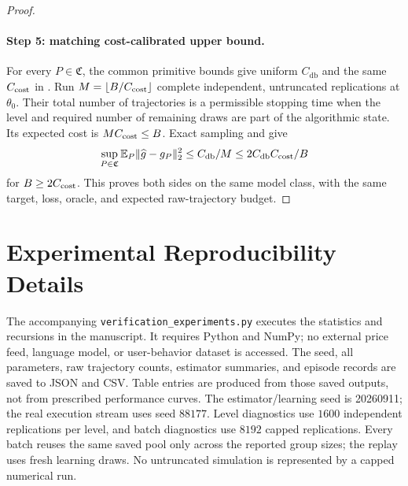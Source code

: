 \documentclass[11pt]{article}
\newcommand{\E}{\mathbb E}
\newcommand{\1}{\mathbf 1}
\DeclarePairedDelimiter{\norm}{\lVert}{\rVert}
\newcommand{\db}{\mathrm{db}}
\theoremstyle{definition}
\begin{document}
\begin{proof}
\paragraph{Step 5: matching cost-calibrated upper bound.}
For every $P\in\mathfrak C$, the common primitive bounds give uniform $C_{\db}$ and the same $C_{\rm cost}$ in . Run $M=\lfloor B/C_{\rm cost}\rfloor$ complete independent, untruncated replications at $\theta_0$. Their total number of trajectories is a permissible stopping time when the level and required number of remaining draws are part of the algorithmic state. Its expected cost is $MC_{\rm cost}\le B$. Exact sampling and  give
\[
 \sup_{P\in\mathfrak C}\E_P\norm{\widehat g-g_P}_2^2
 \le C_{\db}/M\le 2C_{\db}C_{\rm cost}/B
\]
for $B\ge2C_{\rm cost}$. This proves both sides on the same model class, with the same target, loss, oracle, and expected raw-trajectory budget.
\end{proof}


\section{Experimental Reproducibility Details}\label{app:experiments}
The accompanying \texttt{verification\_experiments.py} executes the statistics and recursions in the manuscript. It requires Python and NumPy; no external price feed, language model, or user-behavior dataset is accessed. The seed, all parameters, raw trajectory counts, estimator summaries, and episode records are saved to JSON and CSV. Table entries are produced from those saved outputs, not from prescribed performance curves. The estimator/learning seed is 20260911; the real execution stream uses seed $88177$. Level diagnostics use $1600$ independent replications per level, and batch diagnostics use $8192$ capped replications. Every batch reuses the same saved pool only across the reported group sizes; the replay uses fresh learning draws. No untruncated simulation is represented by a capped numerical run.
\end{document}
